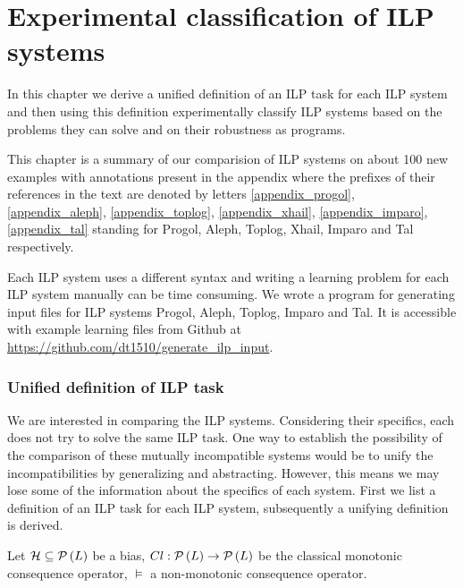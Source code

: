 \chapter{Experimental classification of ILP systems}\label{chap:classification_of_ilp_systems}
In this chapter we derive a unified definition of an ILP task for each ILP system and then using this definition experimentally classify ILP systems based on the problems they can solve and on their robustness as programs.

This chapter is a summary of our comparision of
ILP systems on about 100 new examples with annotations present in the appendix where the prefixes of their references in the text are denoted by letters
\ref{appendix_progol}, \ref{appendix_aleph}, \ref{appendix_toplog}, \ref{appendix_xhail}, \ref{appendix_imparo}, \ref{appendix_tal} standing for
Progol, Aleph, Toplog, Xhail, Imparo and Tal respectively.

Each ILP system uses a different syntax and writing a learning problem for each ILP system manually can be time consuming. We wrote a program  for generating input files for ILP systems Progol, Aleph, Toplog, Imparo and Tal. It is accessible with example learning files from Github at 
\url{https://github.com/dt1510/generate_ilp_input}.

\subsection{Unified definition of ILP task}
We are interested in comparing the ILP systems. Considering their specifics, each does not try to solve the same ILP task. One way to establish the possibility of the comparison of these mutually incompatible systems would be to unify the incompatibilities by generalizing and abstracting. However, this means we may lose some of the information about the specifics of each system. First we list a definition of an ILP task for each ILP system, subsequently a unifying definition is derived.

Let $\mathcal{H} \subseteq \mathcal{P} \left({ L }\right)$ be a bias, $Cl:\mathcal{P} \left({ L }\right) \to \mathcal{P} \left({ L }\right)$ be the classical monotonic consequence operator, $\models$ a non-monotonic consequence operator.

